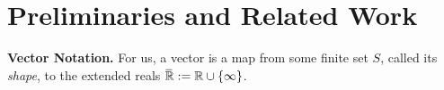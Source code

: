 \documentclass{article}
\begin{document}
\section{Preliminaries and Related Work}

\textbf{Vector Notation.}
%
%
For us, a vector is a map from some finite set $S$, called its 
\emph{shape},
to the extended reals $\mskip1mu\overline{\mskip-1mu\mathbb R\!}\, := \mathbb R \cup \{\infty\}$.
\end{document}
